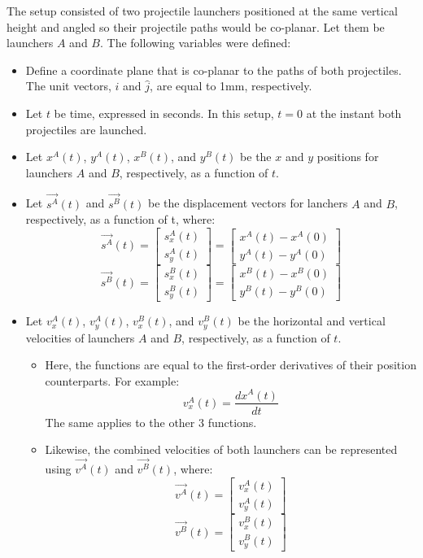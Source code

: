 \documentclass[12pt]{article}
\begin{document}
The setup consisted of two projectile launchers positioned at the same vertical height and angled so their projectile paths would be co-planar. Let them be launchers $A$ and $B$.
The following variables were defined:
\begin{itemize}
    \item Define a coordinate plane that is co-planar to the paths of both projectiles. The unit vectors, $\hat{i}$ and $\hat{j}$, are equal to 1mm, respectively.
    \item Let $t$ be time, expressed in seconds. In this setup, $t=0$ at the instant both projectiles are launched.
    \item Let $x^A(t)$, $y^A(t)$, $x^B(t)$, and $y^B(t)$ be the $x$ and $y$ positions for launchers $A$ and $B$, respectively, as a function of $t$.
    \item Let $\vec{s^A}(t)$ and $\vec{s^B}(t)$ be the displacement vectors for lanchers $A$ and $B$, respectively, as a function  of t, where:
    \[
    \vec{s^A}(t) = \begin{bmatrix} s^A_x(t) \\ s^A_y(t) \end{bmatrix} = \begin{bmatrix} x^A(t) - x^A(0) \\ y^A(t) - y^A(0) \end{bmatrix} 
    \]
    \[
    \vec{s^B}(t) = \begin{bmatrix} s^B_x(t) \\ s^B_y(t) \end{bmatrix} = \begin{bmatrix} x^B(t) - x^B(0) \\ y^B(t) - y^B(0) \end{bmatrix}
    \]
    \item Let $v_x^A(t)$, $v_y^A(t)$, $v_x^B(t)$, and $v_y^B(t)$ be the horizontal and vertical velocities of launchers $A$ and $B$, respectively, as a function of $t$. 
    
    \begin{itemize}
        
        \item Here, the functions are equal to the first-order derivatives of their position counterparts. For example: 
        \[
        v_x^A(t) = \frac{d x^A(t)}{dt}
        \]
        The same applies to the other 3 functions.
        \item Likewise, the combined velocities of both launchers can be represented using $\vec{v^A}(t)$ and $\vec{v^B}(t)$, where:
        \[
        \vec{v^A}(t)= \begin{bmatrix} v_x^A(t) \\ v_y^A(t) \end{bmatrix}
        \]
        \[
        \vec{v^B}(t)= \begin{bmatrix} v_x^B(t) \\ v_y^B(t) \end{bmatrix}
        \]
        

\end{itemize}
\end{itemize}
\end{document}
